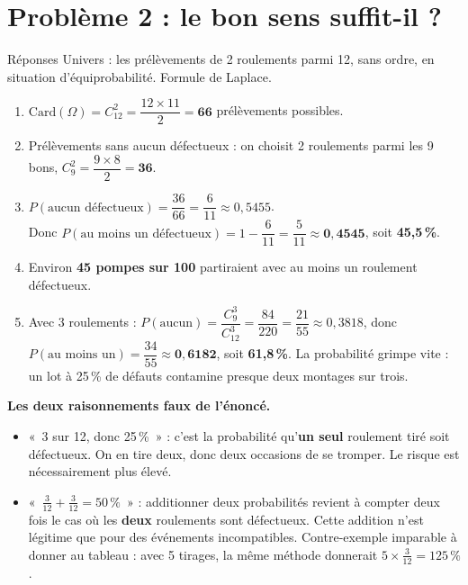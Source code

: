 \documentclass[a4paper,11pt]{article}
\begin{document}
\newpage
\section{Problème 2 : le bon sens suffit-il ?}

\begin{exo}{Réponses}
Univers : les prélèvements de 2 roulements parmi 12, sans ordre, en situation d'équiprobabilité. Formule de Laplace.
\begin{enumerate}
  \item $\mathrm{Card}(\Omega) = C_{12}^{2} = \dfrac{12 \times 11}{2} = \mathbf{66}$ prélèvements possibles.
  \item Prélèvements sans aucun défectueux : on choisit 2 roulements parmi les 9 bons, $C_{9}^{2} = \dfrac{9 \times 8}{2} = \mathbf{36}$.
  \item $P(\text{aucun défectueux}) = \dfrac{36}{66} = \dfrac{6}{11} \approx 0{,}5455$. \\[3pt]
  Donc $P(\text{au moins un défectueux}) = 1 - \dfrac{6}{11} = \dfrac{5}{11} \approx \mathbf{0{,}4545}$, soit \textbf{45,5\,\%}.
  \item Environ \textbf{45 pompes sur 100} partiraient avec au moins un roulement défectueux.
  \item Avec 3 roulements : $P(\text{aucun}) = \dfrac{C_{9}^{3}}{C_{12}^{3}} = \dfrac{84}{220} = \dfrac{21}{55} \approx 0{,}3818$, donc \\[3pt]
  $P(\text{au moins un}) = \dfrac{34}{55} \approx \mathbf{0{,}6182}$, soit \textbf{61,8\,\%}. La probabilité grimpe vite : un lot à 25\,\% de défauts contamine presque deux montages sur trois.
\end{enumerate}
\end{exo}

\begin{piege}
\textbf{Les deux raisonnements faux de l'énoncé.}
\begin{itemize}
  \item «~3 sur 12, donc 25\,\%~» : c'est la probabilité qu'\textbf{un seul} roulement tiré soit défectueux. On en tire deux, donc deux occasions de se tromper. Le risque est nécessairement plus élevé.
  \item «~$\frac{3}{12} + \frac{3}{12} = 50\,\%$~» : additionner deux probabilités revient à compter deux fois le cas où les \textbf{deux} roulements sont défectueux. Cette addition n'est légitime que pour des événements incompatibles. Contre-exemple imparable à donner au tableau : avec 5 tirages, la même méthode donnerait $5 \times \frac{3}{12} = 125\,\%$.
\end{itemize}
\end{piege}
\end{document}
